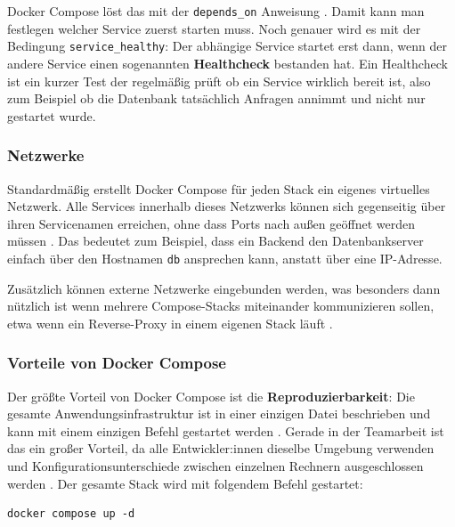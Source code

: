 Docker Compose löst das mit der \texttt{depends\_on} Anweisung 
\cite{docker_compose}. Damit kann man festlegen welcher Service 
zuerst starten muss. Noch genauer wird es mit der Bedingung 
\texttt{service\_healthy}: Der abhängige Service startet erst 
dann, wenn der andere Service einen sogenannten 
\textbf{Healthcheck} bestanden hat. Ein Healthcheck ist ein 
kurzer Test der regelmäßig prüft ob ein Service wirklich 
bereit ist, also zum Beispiel ob die Datenbank tatsächlich 
Anfragen annimmt und nicht nur gestartet wurde.

\subsubsection{Netzwerke}

Standardmäßig erstellt Docker Compose für jeden Stack ein eigenes 
virtuelles Netzwerk. Alle Services innerhalb dieses Netzwerks können 
sich gegenseitig über ihren Servicenamen erreichen, ohne dass Ports 
nach außen geöffnet werden müssen \cite{docker_compose}. Das bedeutet 
zum Beispiel, dass ein Backend den Datenbankserver einfach über den 
Hostnamen \texttt{db} ansprechen kann, anstatt über eine IP-Adresse.

Zusätzlich können externe Netzwerke eingebunden werden, was besonders 
dann nützlich ist wenn mehrere Compose-Stacks miteinander kommunizieren 
sollen, etwa wenn ein Reverse-Proxy in einem eigenen Stack läuft 
\cite{docker_compose}.

\subsubsection{Vorteile von Docker Compose}

Der größte Vorteil von Docker Compose ist die \textbf{Reproduzierbarkeit}: 
Die gesamte Anwendungsinfrastruktur ist in einer einzigen Datei 
beschrieben und kann mit einem einzigen Befehl gestartet werden 
\cite{docker_compose}. Gerade in der Teamarbeit ist das ein großer 
Vorteil, da alle Entwickler:innen dieselbe Umgebung verwenden und 
Konfigurationsunterschiede zwischen einzelnen Rechnern ausgeschlossen 
werden \cite{docker_compose}. Der gesamte Stack wird mit folgendem 
Befehl gestartet:

\begin{verbatim}
docker compose up -d
\end{verbatim}